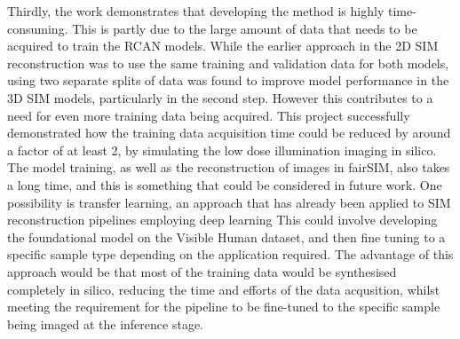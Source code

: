 \documentclass[12pt]{article}
\begin{document}
Thirdly, the work demonstrates that developing the method is highly time-consuming.
This is partly due to the large amount of data that needs to be acquired to train the RCAN models.
While the earlier approach in the 2D SIM reconstruction was to use the same training and validation data for both models,
using two separate splits of data was found to improve model performance in the 3D SIM models,
particularly in the second step.
However this contributes to a need for even more training data being acquired.
This project successfully demonstrated how the training data acquisition time could be reduced by around a factor of at least 2,
by simulating the low dose illumination imaging in silico.
The model training, as well as the reconstruction of images in fairSIM,
also takes a long time, and this is something that could be considered in future work.
One possibility is transfer learning, an approach that has already been applied to SIM reconstruction pipelines employing deep learning \cite{mlsim}
This could involve developing the foundational model on the Visible Human dataset,
and then fine tuning to a specific sample type depending on the application required.
The advantage of this approach would be that most of the training data would be synthesised completely in silico,
reducing the time and efforts of the data acqusition,
whilst meeting the requirement for the pipeline to be fine-tuned to the specific sample being imaged at the inference stage.
\end{document}

